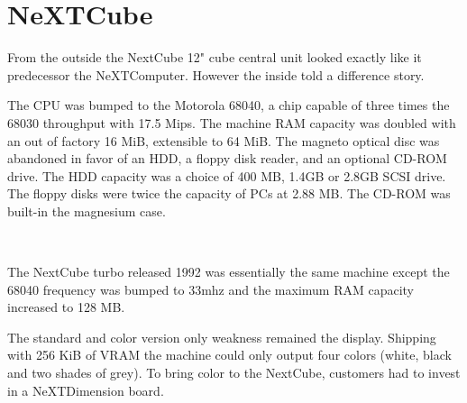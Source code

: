 \section{NeXTCube}
From the outside the NextCube 12" cube central unit looked exactly like it predecessor the NeXTComputer. However the inside told a difference story.\\
\par
 The CPU was bumped to the Motorola 68040, a chip capable of three times the 68030 throughput with 17.5 Mips. The machine RAM capacity was doubled with an out of factory 16 MiB, extensible to 64 MiB. The magneto optical disc was abandoned in favor of an HDD, a floppy disk reader, and an optional CD-ROM drive. The HDD capacity was a choice of 400 MB, 1.4GB or 2.8GB SCSI drive. The floppy disks were twice the capacity of PCs at 2.88 MB. The CD-ROM was built-in the magnesium case.\\
\par
\begin{minipage}{\textwidth}
 \\
\end{minipage}
\par
The NextCube turbo released 1992 was essentially the same machine except the 68040 frequency was bumped to 33mhz and the maximum RAM capacity increased to 128 MB.\\
\par
The standard and color version only weakness remained the display. Shipping with 256 KiB of VRAM the machine could only output four colors (white, black and two shades of grey). To bring color to the NextCube, customers had to invest in a NeXTDimension board.\\
\par
\pagebreak







